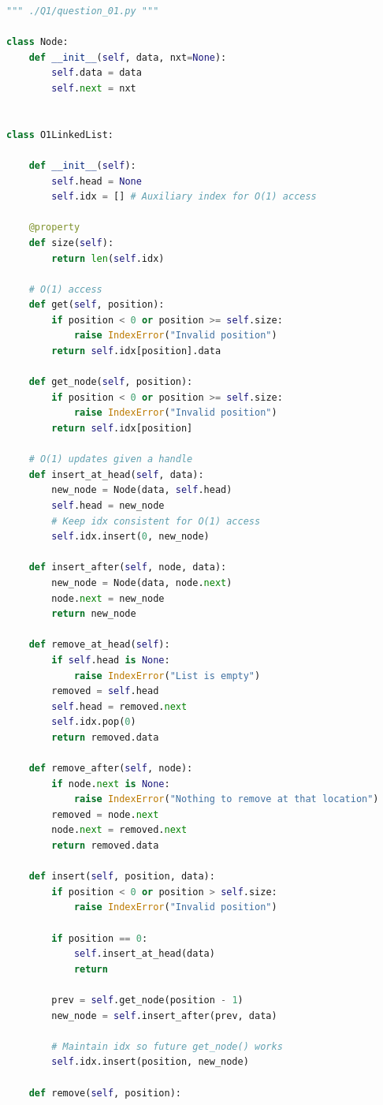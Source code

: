 \documentclass[12pt]{article}
\begin{document}
\begin{lstlisting}[language=Python]
""" ./Q1/question_01.py """

class Node:
    def __init__(self, data, nxt=None):
        self.data = data
        self.next = nxt


class O1LinkedList:

    def __init__(self):
        self.head = None
        self.idx = [] # Auxiliary index for O(1) access

    @property
    def size(self):
        return len(self.idx)

    # O(1) access
    def get(self, position):
        if position < 0 or position >= self.size:
            raise IndexError("Invalid position")
        return self.idx[position].data

    def get_node(self, position):
        if position < 0 or position >= self.size:
            raise IndexError("Invalid position")
        return self.idx[position]

    # O(1) updates given a handle
    def insert_at_head(self, data):
        new_node = Node(data, self.head)
        self.head = new_node
        # Keep idx consistent for O(1) access
        self.idx.insert(0, new_node)

    def insert_after(self, node, data):
        new_node = Node(data, node.next)
        node.next = new_node
        return new_node

    def remove_at_head(self):
        if self.head is None:
            raise IndexError("List is empty")
        removed = self.head
        self.head = removed.next
        self.idx.pop(0)
        return removed.data

    def remove_after(self, node):
        if node.next is None:
            raise IndexError("Nothing to remove at that location")
        removed = node.next
        node.next = removed.next
        return removed.data

    def insert(self, position, data):
        if position < 0 or position > self.size:
            raise IndexError("Invalid position")

        if position == 0:
            self.insert_at_head(data)
            return

        prev = self.get_node(position - 1)
        new_node = self.insert_after(prev, data)

        # Maintain idx so future get_node() works
        self.idx.insert(position, new_node)

    def remove(self, position):


\end{lstlisting}
\end{document}
